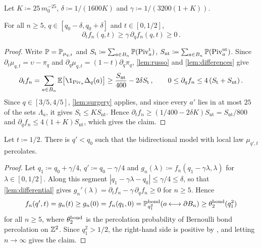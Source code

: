 \documentclass[11pt,letterpaper]{article}
\begin{document}
Let $K\coloneqq25\,m_0^{-25}$, $\delta\coloneqq1/(1600K)$ and $\gamma\coloneqq1/(3200(1+K))$.

\begin{lemma}\label{lem:differential}
For all $n\ge5$, $q\in[q_0-\delta,q_0+\delta]$ and $t\in[0,1/2]$,
\begin{equation*}
\partial_tf_n(q,t)\ge\gamma\,\partial_qf_n(q,t)\ge0\,.
\end{equation*}
\end{lemma}

\begin{proof}
Write $\P=\P_{\mu_{q,t}}$ and $S_{\mathrm t}\coloneqq\sum_{a\in B_n}\P(\Piv^{\mathrm t}_a)$, $S_{\mathrm{nt}}\coloneqq\sum_{a\in B_n}\P(\Piv^{\mathrm{nt}}_a)$. Since $\partial_t\mu_{q,t}=\upsilon-\pi_q$ and $\partial_q\mu_{q,t}=(1-t)\partial_q\pi_q$, \cref{lem:russo} and \cref{lem:differences} give
\begin{equation*}
\partial_tf_n=\sum_{a\in B_n}\E\big[\1_{\Piv_a}\Delta_q(a)\big]\ge\frac{S_{\mathrm{nt}}}{400}-2\delta S_{\mathrm t}\,,\qquad 0\le\partial_qf_n\le4\,(S_{\mathrm t}+S_{\mathrm{nt}})\,.
\end{equation*}
Since $q\in[3/5,4/5]$, \cref{lem:surgery} applies, and since every $a'$ lies in at most $25$ of the sets $\Lambda_a$, it gives $S_{\mathrm t}\le K S_{\mathrm{nt}}$. Hence $\partial_tf_n\ge(1/400-2\delta K)S_{\mathrm{nt}}=S_{\mathrm{nt}}/800$ and $\partial_qf_n\le4(1+K)S_{\mathrm{nt}}$, which gives the claim.
\end{proof}

\begin{proposition}\label{prop:enhanced}
Let $t\coloneqq1/2$. There is $q'<q_0$ such that the bidirectional model with local law $\mu_{q',t}$ percolates.
\end{proposition}

\begin{proof}
Let $q_1\coloneqq q_0+\gamma/4$, $q'\coloneqq q_0-\gamma/4$ and $g_n(\lambda)\coloneqq f_n(q_1-\gamma\lambda,\lambda)$ for $\lambda\in[0,1/2]$. Along this segment $|q_1-\gamma\lambda-q_0|\le\gamma/4\le\delta$, so that \cref{lem:differential} gives $g_n'(\lambda)=\partial_tf_n-\gamma\,\partial_qf_n\ge0$ for $n\ge5$. Hence
\begin{equation*}
f_n(q',t)=g_n(t)\ge g_n(0)=f_n(q_1,0)=\P^{\bond}_{q_1^2}(o\lra\partial B_n)\ge\theta^{\bond}_2(q_1^2)
\end{equation*}
for all $n\ge5$, where $\theta^{\bond}_2$ is the percolation probability of Bernoulli bond percolation on $\Z^2$. Since $q_1^2>1/2$, the right-hand side is positive by \cite{Kes80}, and letting $n\to\infty$ gives the claim.
\end{proof}
\end{document}
